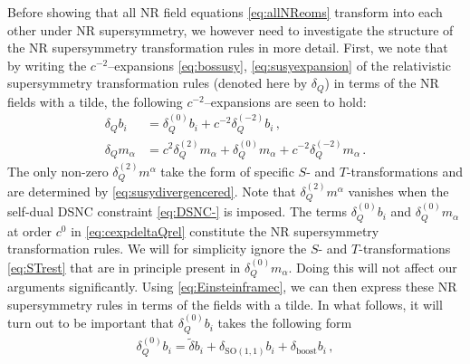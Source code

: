 \documentclass[a4paper,10pt,openany]{article}
\begin{document}
	Before showing that all NR field equations \eqref{eq:allNReoms} transform into each other under NR supersymmetry, we however need to investigate the structure of the NR supersymmetry transformation rules in more detail. First, we note that by writing the $c^{-2}$--expansions \eqref{eq:bossusy}, \eqref{eq:susyexpansion} of the relativistic supersymmetry transformation rules (denoted here by $\delta_Q$) in terms of the NR fields with a tilde, the following $c^{-2}$--expansions are seen to hold:
	\begin{align}
		\label{eq:cexpdeltaQrel}
		\delta_Q b_i &= \delta^{(0)}_Q b_i + c^{-2} \delta^{(-2)}_Q b_i \,, \nonumber \\
		\delta_Q m_\alpha &= c^2 \delta_Q^{(2)} m_\alpha + \delta^{(0)}_Q m_\alpha + c^{-2} \delta^{(-2)}_Q m_\alpha \,.
	\end{align}
	The only non-zero $\delta_Q^{(2)} m^\alpha$ take the form of specific $S$- and $T$-transformations and are determined by \eqref{eq:susydivergencered}. Note that $\delta_Q^{(2)} m^\alpha$ vanishes when the self-dual DSNC constraint \eqref{eq:DSNC-} is imposed. The terms $\delta_Q^{(0)} b_i$ and $\delta_Q^{(0)} m_\alpha$ at order $c^0$ in \eqref{eq:cexpdeltaQrel} constitute the NR supersymmetry transformation rules. We will for simplicity ignore the $S$- and $T$-transformations \eqref{eq:STrest} that are in principle present in $\delta_Q^{(0)} m_\alpha$. Doing this will not affect our arguments significantly. Using \eqref{eq:Einsteinframec}, we can then express these NR supersymmetry rules in terms of the fields with a tilde. In what follows, it will turn out to be important that $\delta_Q^{(0)} b_i$ takes the following form
	\begin{align}\label{eq:splitoffm}
		\delta_Q^{(0)}b_i = \tilde\delta b_i + \delta_{\mathrm{SO}(1,1)} b_i+ \delta_{\mathrm{boost}} b_i\,,
	\end{align}
\end{document}
